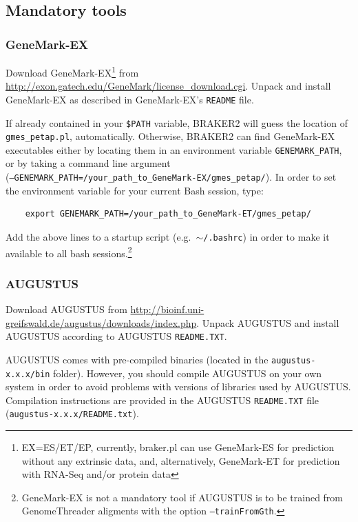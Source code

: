 \documentclass[a4paper,10pt]{report}
\begin{document}
\subsection{Mandatory tools}

\subsubsection{GeneMark-EX}

Download GeneMark-EX\footnote{EX=ES/ET/EP, currently, braker.pl can use GeneMark-ES for prediction without any extrinsic data, and, alternatively, GeneMark-ET for prediction with RNA-Seq and/or protein data} from \url{http://exon.gatech.edu/GeneMark/license_download.cgi}.
 Unpack and install GeneMark-EX as described in GeneMark-EX's \texttt{README} file.

If already contained in your \texttt{\$PATH} variable, BRAKER2 will guess the location of \texttt{gmes\_petap.pl}, automatically. Otherwise, BRAKER2 can find GeneMark-EX executables either by locating them in an environment variable \texttt{GENEMARK\_PATH}, or by taking a command line argument\\ (\texttt{--GENEMARK\_PATH=/your\_path\_to\_GeneMark-EX/gmes\_petap/}). In order to set the environment variable for your current Bash session, type: 

    \begin{verbatim}
    export GENEMARK_PATH=/your_path_to_GeneMark-ET/gmes_petap/
\end{verbatim}

Add the above lines to a startup script (e.g.~\texttt{$\sim$/.bashrc}) in order to make it available to all bash sessions.\footnote{GeneMark-EX is not a mandatory tool if AUGUSTUS is to be trained from GenomeThreader aligments with the option \texttt{--trainFromGth}.}


\subsubsection{AUGUSTUS}

Download AUGUSTUS from \url{http://bioinf.uni-greifswald.de/augustus/downloads/index.php}.
 Unpack AUGUSTUS and install AUGUSTUS  according to AUGUSTUS \texttt{README.TXT}. 
 
 AUGUSTUS comes with pre-compiled binaries (located in the 
   \texttt{augustus-x.x.x/bin} folder). However, you should compile AUGUSTUS on your own system in order to avoid problems with versions of libraries used by AUGUSTUS. Compilation instructions are provided in the AUGUSTUS \texttt{README.TXT} file
   (\texttt{augustus-x.x.x/README.txt}).
\end{document}
